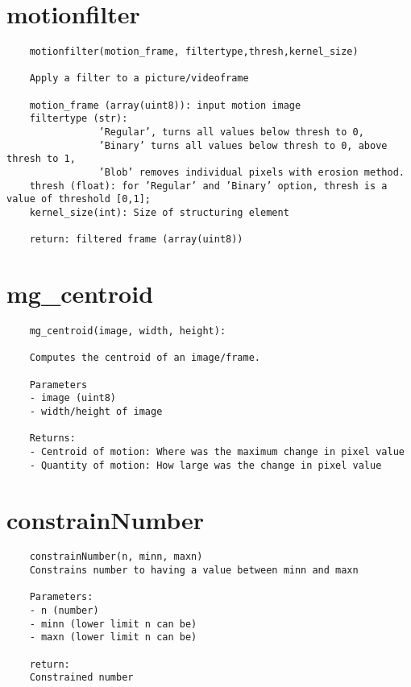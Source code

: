 \documentclass[9pt]{extarticle}
\begin{document}
\section*{motionfilter}
    \begin{verbatim}
    motionfilter(motion_frame, filtertype,thresh,kernel_size)
    
    Apply a filter to a picture/videoframe
    
    motion_frame (array(uint8)): input motion image
    filtertype (str):
                ’Regular’, turns all values below thresh to 0,
                ’Binary’ turns all values below thresh to 0, above thresh to 1,
                ’Blob’ removes individual pixels with erosion method.
    thresh (float): for ’Regular’ and ’Binary’ option, thresh is a value of threshold [0,1];
    kernel_size(int): Size of structuring element
    
    return: filtered frame (array(uint8))
    \end{verbatim}

\section*{mg\_centroid}
    \begin{verbatim}
    mg_centroid(image, width, height):

    Computes the centroid of an image/frame.
    
    Parameters
    - image (uint8)
    - width/height of image
    
    Returns:
    - Centroid of motion: Where was the maximum change in pixel value
    - Quantity of motion: How large was the change in pixel value
    \end{verbatim}
    
\section*{constrainNumber}
    \begin{verbatim}
    constrainNumber(n, minn, maxn)
    Constrains number to having a value between minn and maxn
    
    Parameters:
    - n (number)
    - minn (lower limit n can be)
    - maxn (lower limit n can be)
    
    return:
    Constrained number
    \end{verbatim}
\end{document}

